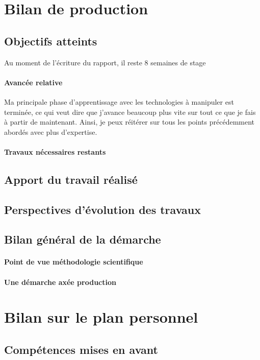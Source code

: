 \documentclass{rapportCS}
\begin{document}
\newpage
\section{Bilan de production}
\subsection{Objectifs atteints}
Au moment de l'écriture du rapport, il reste 8 semaines de stage

\paragraph{Avancée relative}
Ma principale phase d'apprentissage avec les technologies à manipuler est terminée,
ce qui veut dire que j'avance beaucoup plus vite sur tout ce que je fais à partir de maintenant.
Ainsi, je peux réitérer sur tous les points précédemment abordés avec plus d'expertise.

\paragraph{Travaux nécessaires restants}

\subsection{Apport du travail réalisé}

\subsection{Perspectives d'évolution des travaux}

\subsection{Bilan général de la démarche}
\paragraph{Point de vue méthodologie scientifique}
\paragraph{Une démarche axée production}

\newpage
\section{Bilan sur le plan personnel}
\subsection{Compétences mises en avant}
\end{document}
